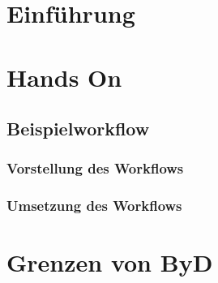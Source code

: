 \section{Einführung}

\section{Hands On}

\subsection{Beispielworkflow}
\label{sec:byd-bsp}

\subsubsection{Vorstellung des Workflows}
\label{sec:byd-bsp-vorstellung}

\subsubsection{Umsetzung des Workflows}
\label{sec:byd-bsp-umsetzung}

\section{Grenzen von ByD}
